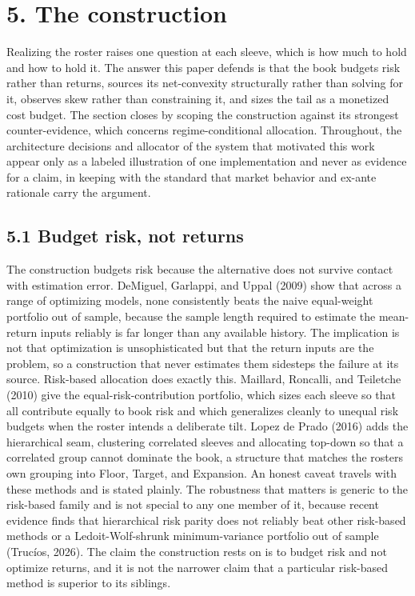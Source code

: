 \documentclass[12pt, a4paper]{article}
\begin{document}
\section*{5. The construction}\label{the-construction}

Realizing the roster raises one question at each sleeve, which is how
much to hold and how to hold it. The answer this paper defends is that
the book budgets risk rather than returns, sources its net-convexity
structurally rather than solving for it, observes skew rather than
constraining it, and sizes the tail as a monetized cost budget. The
section closes by scoping the construction against its strongest
counter-evidence, which concerns regime-conditional allocation.
Throughout, the architecture decisions and allocator of the system that
motivated this work appear only as a labeled illustration of one
implementation and never as evidence for a claim, in keeping with the
standard that market behavior and ex-ante rationale carry the argument.

\subsection*{5.1 Budget risk, not returns}\label{budget-risk-not-returns}

The construction budgets risk because the alternative does not survive
contact with estimation error. DeMiguel, Garlappi, and Uppal (2009) show
that across a range of optimizing models, none consistently beats the
naive equal-weight portfolio out of sample, because the sample length
required to estimate the mean-return inputs reliably is far longer than
any available history. The implication is not that optimization is
unsophisticated but that the return inputs are the problem, so a
construction that never estimates them sidesteps the failure at its
source. Risk-based allocation does exactly this. Maillard, Roncalli, and
Teiletche (2010) give the equal-risk-contribution portfolio, which sizes
each sleeve so that all contribute equally to book risk and which
generalizes cleanly to unequal risk budgets when the roster intends a
deliberate tilt. Lopez de Prado (2016) adds the hierarchical seam,
clustering correlated sleeves and allocating top-down so that a
correlated group cannot dominate the book, a structure that matches the
roster\textquotesingle s own grouping into Floor, Target, and Expansion.
An honest caveat travels with these methods and is stated plainly. The
robustness that matters is generic to the risk-based family and is not
special to any one member of it, because recent evidence finds that
hierarchical risk parity does not reliably beat other risk-based methods
or a Ledoit-Wolf-shrunk minimum-variance portfolio out of sample
(Trucíos, 2026). The claim the construction rests on is to budget risk
and not optimize returns, and it is not the narrower claim that a
particular risk-based method is superior to its siblings.
\end{document}
